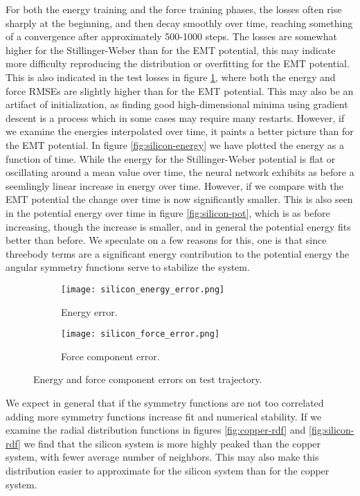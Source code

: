 For both the energy training and the force training phases, the 
losses often rise sharply at the beginning, and then decay smoothly over time,
reaching something of a convergence after approximately 500-1000 steps.
The losses are somewhat higher for the Stillinger-Weber than for the
EMT potential, this may indicate more difficulty reproducing the distribution
or overfitting for the EMT potential.
This is also indicated in the test losses in figure \ref{fig:silicon-error},
where both the energy and force RMSEs are slightly higher than for the
EMT potential. This may also be an artifact of initialization, as finding
good high-dimensional minima using gradient descent is a process which in some cases
may require many restarts.
However, if we examine the energies interpolated over time,
it paints a better picture than for the EMT potential.
In figure \ref{fig:silicon-energy} we have plotted the energy as a function
of time. While the energy for the Stillinger-Weber potential is flat or oscillating
around a mean value over time, the neural network exhibits as before
a seemlingly linear increase in energy over time.
However, if we compare with the EMT potential the change over time is now significantly
smaller. This is also seen in the potential energy over time in figure \ref{fig:silicon-pot},
which is as before increasing, though the increase is smaller, and in general the potential
energy fits better than before.
We speculate on a few reasons for this, one is that since threebody terms are a significant
energy contribution to the potential energy the angular symmetry functions serve to
stabilize the system. 

\begin{figure}[H]
\begin{adjustbox}{max width=1.2\linewidth,center}
\centering
  \begin{subfigure}[b]{0.55\textwidth}
      \texttt{[image: silicon\_energy\_error.png]}
      \caption{Energy error.}
  \end{subfigure}
  \hfill
  \begin{subfigure}[b]{0.55\textwidth}
      \texttt{[image: silicon\_force\_error.png]}
      \caption{Force component error.}
  \end{subfigure}
\end{adjustbox}
    \caption{Energy and force component errors on test trajectory.}
    \label{fig:silicon-error}
\end{figure}

We expect in general that if the symmetry functions are not too correlated adding
more symmetry functions increase fit and numerical stability.
If we examine the radial distribution functions in figures
\ref{fig:copper-rdf} and \ref{fig:silicon-rdf} we find that the silicon system is more
highly peaked than the copper system, with fewer average number of neighbors.
This may also make this distribution easier to approximate for the silicon system
than for the copper system.

